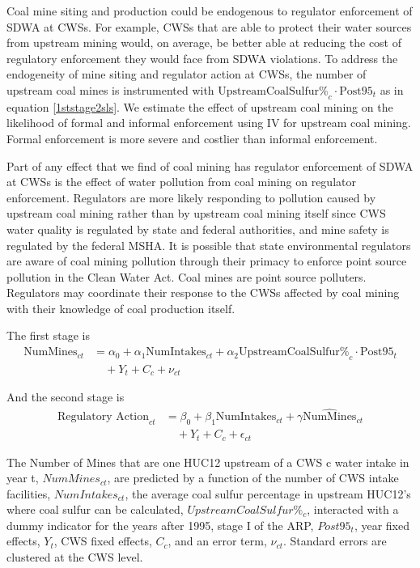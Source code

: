 \documentclass{article}
\begin{document}
Coal mine siting and production could be endogenous to regulator enforcement of SDWA at CWSs. For example, CWSs that are able to protect their water sources from upstream mining would, on average, be better able at reducing the cost of regulatory enforcement they would face from SDWA violations. To address the endogeneity of mine siting and regulator action at CWSs, the number of upstream coal mines is instrumented with $\text{UpstreamCoalSulfur\%}_c \cdot \text{Post95}_t$ as in equation \ref{1ststage2sls}. We estimate the effect of upstream coal mining on the likelihood of formal and informal enforcement using IV for upstream coal mining. Formal enforcement is more severe and costlier than informal enforcement. 

Part of any effect that we find of coal mining has regulator enforcement of SDWA at CWSs is the effect of water pollution from coal mining on regulator enforcement. Regulators are more likely responding to pollution caused by upstream coal mining rather than by upstream coal mining itself since CWS water quality is regulated by state and federal authorities, and mine safety is regulated by the federal MSHA. It is possible that state environmental regulators are aware of coal mining pollution through their primacy to enforce point source pollution in the Clean Water Act. Coal mines are point source polluters. Regulators may coordinate their response to the CWSs affected by coal mining with their knowledge of coal production itself.

The first stage is
\begin{equation}\label{1ststage2slsreg}
\begin{split}
\text{NumMines}_{ct} &= \alpha_0 + \alpha_1\text{NumIntakes}_{ct} + \alpha_2\text{UpstreamCoalSulfur\%}_c \cdot \text{Post95}_t \\
&\quad + Y_t + C_c + \nu_{ct}
\end{split}
\end{equation}

And the second stage is
\begin{equation}\label{2ndstage2slsreg}
\begin{split}
\text{Regulatory Action}_{ct} &= \beta_0 + \beta_1\text{NumIntakes}_{ct} + \gamma\widehat{\text{NumMines}}_{ct} \\
&\quad + Y_t + C_c + \epsilon_{ct}
\end{split}
\end{equation}

The Number of Mines that are one HUC12 upstream of a CWS c water intake in year t, $NumMines_{ct}$, are predicted by a function of the number of CWS intake facilities, $NumIntakes_{ct}$, the average coal sulfur percentage in upstream HUC12's where coal sulfur can be calculated, $UpstreamCoalSulfur\%_c$, interacted with a dummy indicator for the years after 1995, stage I of the ARP, $Post95_t$, year fixed effects, $Y_t$, CWS fixed effects, $C_c$, and an error term, $\nu_{ct}$. Standard errors are clustered at the CWS level.
\end{document}
